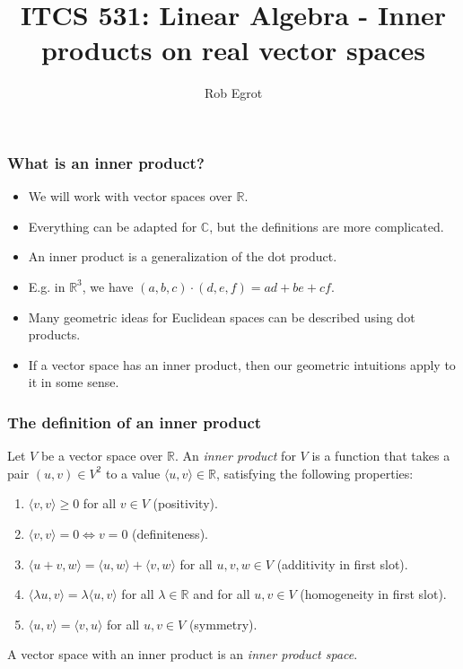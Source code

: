 \documentclass[handout]{beamer}
\title{ITCS 531: Linear Algebra - Inner products on real vector spaces}
\date{}
\author{Rob Egrot}
\newcommand{\bR}{\mathbb{R}}
\newcommand{\bC}{\mathbb{C}}
\begin{document}
\begin{frame}
\titlepage
\end{frame}

\begin{frame}
\frametitle{What is an inner product?}
\begin{itemize}
\item  We will work with vector spaces over $\bR$.\vspace{0.5cm} 
\item Everything can be adapted for $\bC$, but the definitions are more complicated.\vspace{0.5cm} 
\item An inner product is a generalization of the dot product. \vspace{0.5cm} 
\item E.g. in $\bR^3$, we have $(a,b,c)\cdot(d,e,f)=ad+be+cf$.  \vspace{0.5cm} 
\item Many geometric ideas for Euclidean spaces can be described using dot products.\vspace{0.5cm} 
\item If a vector space has an inner product, then our geometric intuitions apply to it in some sense. 
\end{itemize}
\end{frame}

\begin{frame}
\frametitle{The definition of an inner product}
\begin{definition}
Let $V$ be a vector space over $\bR$. An \emph{inner product} for $V$ is a function that takes a pair $(u,v)\in V^2$ to a value $\langle u,v\rangle  \in\bR$, satisfying the following properties:
\begin{enumerate}
\item $\langle v,v\rangle  \geq 0$ for all $v\in V$ (positivity).
\item $\langle v,v\rangle  =0\iff v = 0$ (definiteness).
\item $\langle u+v,w\rangle  =\langle u,w\rangle  +\langle v,w\rangle  $ for all $u,v,w\in V$ (additivity in first slot).
\item $\langle \lambda u,v\rangle   = \lambda\langle u,v\rangle  $ for all $\lambda\in \bR$ and for all $u,v\in V$ (homogeneity in first slot).  
\item $\langle u,v\rangle   = \langle v,u\rangle  $ for all $u,v\in V$ (symmetry).
\end{enumerate}
\end{definition}\vspace{0.1cm}
\begin{definition}
A vector space with an inner product is an \emph{inner product space}.  
\end{definition}
\end{frame}
\end{document}
